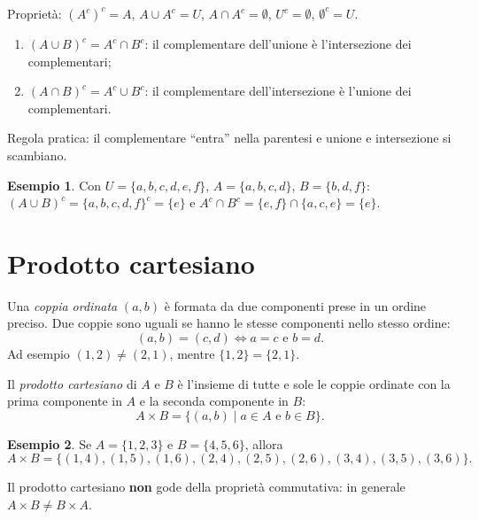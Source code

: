 \documentclass[11pt,a4paper]{article}
\theoremstyle{definition}
\newtheorem*{esempio}{Esempio}
\begin{document}
Proprietà: $(A^c)^c = A$, \quad $A \cup A^c = U$, \quad
$A \cap A^c = \emptyset$, \quad $U^c = \emptyset$, \quad $\emptyset^c = U$.

\newpage
\begin{teorema}
\begin{enumerate}
    \item $(A \cup B)^c = A^c \cap B^c$: il complementare dell'unione
          è l'intersezione dei complementari;
    \item $(A \cap B)^c = A^c \cup B^c$: il complementare
          dell'intersezione è l'unione dei complementari.
\end{enumerate}
\end{teorema}

Regola pratica: il complementare ``entra'' nella parentesi e unione e
intersezione si scambiano.

\begin{esempio}
Con $U = \{a, b, c, d, e, f\}$, $A = \{a, b, c, d\}$, $B = \{b, d, f\}$:
$(A \cup B)^c = \{a,b,c,d,f\}^c = \{e\}$ e
$A^c \cap B^c = \{e, f\} \cap \{a, c, e\} = \{e\}$.
\end{esempio}

\section{Prodotto cartesiano}

\begin{definizione}
Una \emph{coppia ordinata} $(a, b)$ è formata da due componenti prese in un
ordine preciso. Due coppie sono uguali se hanno le stesse componenti nello
stesso ordine:
\[
(a, b) = (c, d) \iff a = c \text{ e } b = d.
\]
Ad esempio $(1, 2) \neq (2, 1)$, mentre $\{1, 2\} = \{2, 1\}$.
\end{definizione}

\begin{definizione}
Il \emph{prodotto cartesiano} di $A$ e $B$ è l'insieme di tutte e sole le
coppie ordinate con la prima componente in $A$ e la seconda componente
in $B$:
\[
A \times B = \{(a, b) \mid a \in A \text{ e } b \in B\}.
\]
\end{definizione}

\begin{esempio}
Se $A = \{1, 2, 3\}$ e $B = \{4, 5, 6\}$, allora
\[
A \times B = \{(1,4), (1,5), (1,6), (2,4), (2,5), (2,6), (3,4), (3,5), (3,6)\}.
\]
\end{esempio}

Il prodotto cartesiano \textbf{non} gode della proprietà commutativa:
in generale $A \times B \neq B \times A$.
\end{document}
